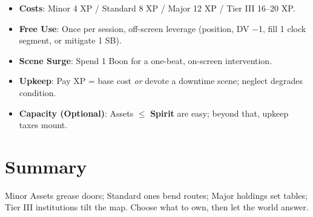 \begin{tcolorbox}[colback=blue!5!white,colframe=blue!75!black,title=Asset Quick Reference,fonttitle=\bfseries]
\begin{itemize}
  \item \textbf{Costs}: Minor 4 XP / Standard 8 XP / Major 12 XP / Tier III 16–20 XP.
  \item \textbf{Free Use}: Once per session, off-screen leverage (position, DV −1, fill 1 clock segment, or mitigate 1 SB).
  \item \textbf{Scene Surge}: Spend 1 Boon for a one-beat, on-screen intervention.
  \item \textbf{Upkeep}: Pay XP = base cost \emph{or} devote a downtime scene; neglect degrades condition.
  \item \textbf{Capacity (Optional)}: Assets $\leq$ \textbf{Spirit} are easy; beyond that, upkeep taxes mount.
\end{itemize}
\end{tcolorbox}

\section{Summary}
Minor Assets grease doors; Standard ones bend routes; Major holdings set tables; Tier III institutions tilt the map. Choose what to own, then let the world answer.

